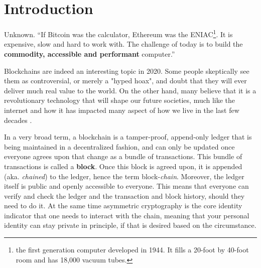 \chapter{Introduction} \label{chap:intoroduction}

\ifpdf
    \graphicspath{{1_introduction/figures/PNG/}{1_introduction/figures/PDF/}{1_introduction/figures/}}
\else
    \graphicspath{{1_introduction/figures/EPS/}{1_introduction/figures/}}
\fi

\begin{chapquote}{Unknown.}
``If Bitcoin was the calculator, Ethereum was the ENIAC\footnote{the first generation computer developed in 1944. It fills a 20-foot by 40-foot room and has 18,000 vacuum tubes.}. It is expensive, slow and hard to work with. The challenge of today is to build the \textbf{commodity, accessible and performant} computer.''
\end{chapquote}



Blockchains are indeed an interesting topic in 2020. Some people skeptically see them as controversial, or merely a "hyped hoax", and doubt that they will ever deliver much real value to the world. On the other hand, many believe that it is a revolutionary technology that will shape our future societies, much like the internet and how it has impacted many aspect of how we live in the last few decades \cite{will_blockchain_be_big_deal}. 

In a very broad term, a blockchain is a tamper-proof, append-only ledger that is being maintained in a decentralized fashion, and can only be updated once everyone agrees upon that change as a bundle of transactions. This bundle of transactions is called a \textbf{block}. Once this block is agreed upon, it is appended (aka. \textit{chained}) to the ledger, hence the term block-\textit{chain}. Moreover, the ledger itself is public and openly accessible to everyone. This means that everyone can verify and check the ledger and the transaction and block history, should they need to do it. At the same time asymmetric cryptography is the core identity indicator that one needs to interact with the chain, meaning that your personal identity can stay private in principle, if that is desired based on the circumstance. 

